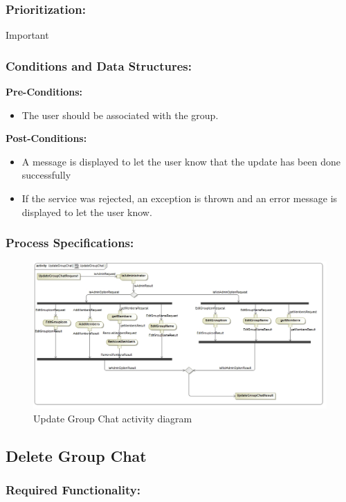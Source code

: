 \documentclass[a4paper]{article}
\begin{document}
\subsubsection{Prioritization:} Important

\subsubsection{Conditions and Data Structures:}
\textbf{Pre-Conditions:}
\begin{itemize}
	\item The user should be associated with the group. 
\end{itemize}
\textbf{Post-Conditions:}
\begin{itemize}
	\item A message is displayed to let the user know that the update has been done successfully
	\item If the service was rejected, an exception is thrown and an error message is displayed to let the user know.
\end{itemize}

\subsubsection{Process Specifications:} 
\begin{figure}[H]
\includegraphics[width=1\linewidth]{./pictures/update_GroupChat.jpg}
\caption{Update Group Chat activity diagram}
\end{figure}



\subsection{Delete Group Chat}

\subsubsection{Required Functionality:}
\end{document}
